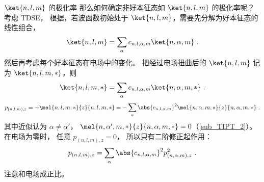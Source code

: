 \begin{example}{$\ket{n,l,m}$ 的极化率}
那么如何确定非好本征态如 $\ket{n,l,m}$ 的极化率呢？ 考虑 TDSE， 根据，若波函数初始处于 $\ket{n,l,m}$，需要先分解为好本征态的线性组合，
\begin{equation}
\ket{n,l,m} = \sum_\alpha c_{n,l,\alpha,m} \ket{n,\alpha,m}~.
\end{equation}
然后再考虑每个好本征态在电场中的变化。 把经过电场扭曲后的 $\ket{n,l,m}$ 记为 $\ket{n,l,m,*}$，则
\begin{equation}
\ket{n,l,m,*} = \sum_\alpha c_{n,l,\alpha,m} \ket{n,\alpha,m,*}~.
\end{equation}
\begin{equation}
p_{(n,l,m),z} = -\mel{n,l,m,*}{z}{n,l,m,*} = -\sum_\alpha \abs{c_{n,l,\alpha,m}}^2\mel{n,\alpha,m,*}{z}{n,\alpha,m,*}~.
\end{equation}
其中近似认为 $\alpha\ne\alpha'$， $\mel{n,\alpha',m,*}{z}{n,\alpha,m,*} = 0$（\autoref{sub_TIPT_2}）。在电场为零时， 任意 $p_{(n,l,m),z} = 0$， 所以只有二阶修正起作用：
\begin{equation}
p_{(n,l,m),z} = \sum_\alpha \abs{c_{n,l,\alpha,m}}^2 p_{(n,\alpha,m),z}^2~.
\end{equation}
注意和电场成正比。
\end{example}
